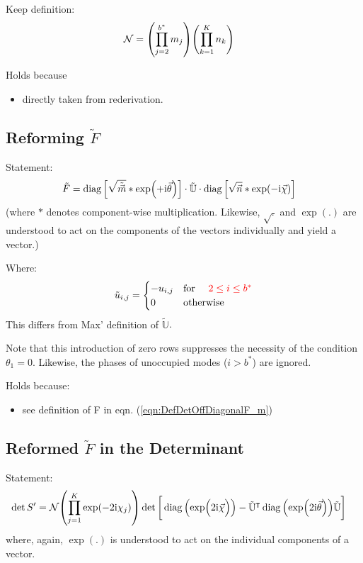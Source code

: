 \documentclass[
	english,
	a4paper,
	fontsize=10pt,
	parskip=half,
	titlepage=true,
	DIV=12,
	final
]{scrreprt}
\newcommand*{\transp}{\ensuremath{^\intercal}}
\newcommand*{\iunit}{\ensuremath{\mathrm{i}}}
\DeclareMathOperator{\diag}{diag}
\begin{document}
Keep definition:
\begin{align}
	\mathcal{N}
&=
	\qty( \prod_{j=2}^{b^*} m_j )
	\qty( \prod_{k=1}^{K}   n_k )
\label{eqn:DefN_m}
\end{align}

Holds because
\begin{itemize}
\item directly taken from rederivation.
\end{itemize}

\subsection{Reforming $\tilde{F}$}
Statement:
\begin{align}
	\tilde{F}
&=
	\diag\qty[ \sqrt{ \tilde{\vec{m}}} * \exp(+\iunit \vec{\theta}) ]
	\cdot \tilde{\mathbb{U}} \cdot
	\diag\qty[ \sqrt{        \vec{n} } * \exp(-\iunit \vec{\chi  }) ]
\end{align}
(where $*$ denotes component-wise multiplication. Likewise, $\sqrt{.}$ and $\exp(.)$ are understood to act on the components of the vectors individually and yield a vector.)

Where:
\begin{equation}
	\tilde{u}_{i,j} = \begin{cases}
		-u_{i,j}		&\qq*{for } {\color{red} 2 \leq i \leq b^*} \\
		0			&\qotherwise*
	\end{cases}
\end{equation}
{\color{red} This differs from Max' definition of $\tilde{\mathbb{U}}$}.

Note that this introduction of zero rows suppresses the necessity of the condition $\theta_1 = 0$. Likewise, the phases of unoccupied modes ($i > b^*$) are ignored.

Holds because:
\begin{itemize}
\item see definition of F in eqn. (\ref{eqn:DefDetOffDiagonalF_m})
\end{itemize}

\subsection{Reformed $\tilde{F}$ in the Determinant}
Statement:
\begin{align}
	\det S'
&=
	\mathcal{N}
	\qty( \prod_{j=1}^{K} \exp(-2\iunit \chi_j) )
	\det\qty[\bigg.
		\diag\qty(\exp(\Big.2\iunit\vec{\chi}))
		-
		\tilde{\mathbb{U}}\transp
		\diag\qty(\exp(2\iunit\vec{\theta}))
		\tilde{\mathbb{U}}
	]
\end{align}
where, again, $\exp(.)$ is understood to act on the individual components of a vector.
\end{document}
